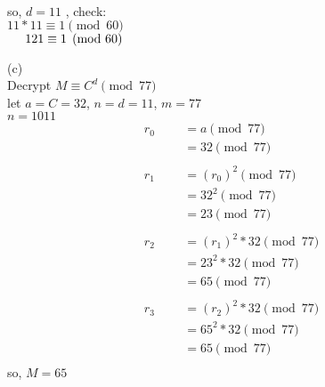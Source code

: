\documentclass{assignment}
\begin{document}
\begin{flushleft}
\begin{problemlist}
\begin{align*}
\end{align*}
so, $d = 11$ , check:\\
$11 * 11 \equiv 1 \pmod{60}$\\
$\hspace{.5cm}121 \equiv 1 \pmod{60}$\\
\newpage
\item [(c)]\hspace{1cm}\\
Decrypt $M \equiv C^d \pmod{77}$\\
let $a=C=32$, $n=d=11$, $m=77$\\
$n=1011$\\
\begin{align*}
r_0 &= a \pmod {77}\\
&= 32 \pmod {77}\\
\hspace{1cm}\\
r_1 &= (r_0)^2 \pmod {77}\\
&= 32^2 \pmod {77}\\
&= 23 \pmod {77}\\
\hspace{1cm}\\
r_2 &= (r_1)^2 * 32 \pmod {77}\\
&= 23^2 * 32 \pmod {77}\\
&= 65 \pmod {77}\\
\hspace{1cm}\\
r_3 &= (r_2)^2 * 32 \pmod {77}\\
&= 65^2 * 32 \pmod {77}\\
&= 65 \pmod{77}\\ 
\end{align*}
so, $M = 65$\\
\end{problemlist}
\end{flushleft}
\end{document}
